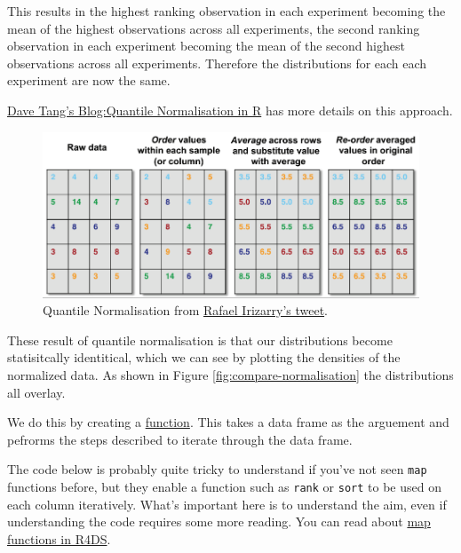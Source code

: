 \documentclass[12pt,]{book}
\theoremstyle{definition}
\theoremstyle{definition}
\theoremstyle{definition}
\theoremstyle{remark}
\begin{document}
This results in the highest ranking observation in each experiment
becoming the mean of the highest observations across all experiments,
the second ranking observation in each experiment becoming the mean of
the second highest observations across all experiments. Therefore the
distributions for each each experiment are now the same.

\href{https://davetang.org/muse/2014/07/07/quantile-normalisation-in-r/}{Dave
Tang's Blog:Quantile Normalisation in R} has more details on this
approach.





\begin{figure}

{\centering \includegraphics[width=0.8\linewidth]{img/quant_norm} 

}

\caption{Quantile Normalisation from
\href{https://twitter.com/rafalab/status/545586012219772928?ref_src=twsrc\%5Etfw}{Rafael
Irizarry's tweet}.}\label{fig:quant-norm}
\end{figure}

These result of quantile normalisation is that our distributions become
statisitcally identitical, which we can see by plotting the densities of
the normalized data. As shown in Figure \ref{fig:compare-normalisation}
the distributions all overlay.

We do this by creating a \protect\hyperlink{function-anatomy}{function}.
This takes a data frame as the arguement and pefrorms the steps
described to iterate through the data frame.

The code below is probably quite tricky to understand if you've not seen
\texttt{map} functions before, but they enable a function such as
\texttt{rank} or \texttt{sort} to be used on each column iteratively.
What's important here is to understand the aim, even if understanding
the code requires some more reading. You can read about
\href{http://r4ds.had.co.nz/iteration.html\#the-map-functions}{map
functions in R4DS}.
\end{document}
